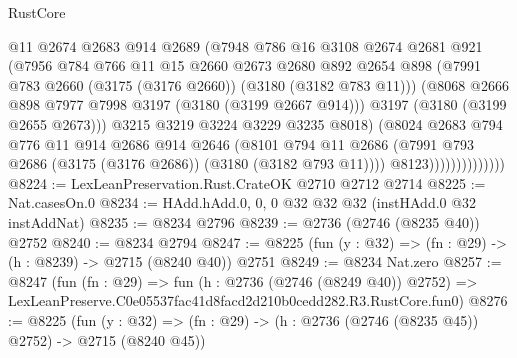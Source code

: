 \begin{lexlean}{RustCore}
\begin{coremodule}
                              @11
                              @2674
                              @2683
                              @914
                              @2689
                              (@7948
                                @786
                                @16
                                @3108
                                @2674
                                @2681
                                @921
                                (@7956
                                  @784
                                  @766
                                  @11
                                  @15
                                  @2660
                                  @2673
                                  @2680
                                  @892
                                  @2654
                                  @898
                                  (@7991 @783 @2660 (@3175 (@3176 @2660)) (@3180 (@3182 @783 @11)))
                                  (@8068 @2666 @898 @7977 @7998 @3197 (@3180 (@3199 @2667 @914)))
                                  @3197
                                  (@3180 (@3199 @2655 @2673)))
                                @3215
                                @3219
                                @3224
                                @3229
                                @3235
                                @8018)
                              (@8024
                                @2683
                                @794
                                @776
                                @11
                                @914
                                @2686
                                @914
                                @2646
                                (@8101
                                  @794
                                  @11
                                  @2686
                                  (@7991 @793 @2686 (@3175 (@3176 @2686)) (@3180 (@3182 @793 @11))))
                                @8123))))))))))))))
@8224 := LexLeanPreservation.Rust.CrateOK @2710 @2712 @2714
@8225 := Nat.casesOn.{0}
@8234 := HAdd.hAdd.{0, 0, 0} @32 @32 @32 (instHAdd.{0} @32 instAddNat)
@8235 := @8234 @2796
@8239 := @2736 (@2746 (@8235 @40)) @2752
@8240 := @8234 @2794
@8247 := @8225 (fun (y : @32) => (fn : @29) -> (h : @8239) -> @2715 (@8240 @40)) @2751
@8249 := @8234 Nat.zero
@8257 := @8247
    (fun (fn : @29) =>
    fun (h : @2736 (@2746 (@8249 @40)) @2752) =>
    LexLeanPreserve.C0e05537fac41d8facd2d210b0cedd282.R3.RustCore.fun0)
@8276 := @8225
    (fun (y : @32) => (fn : @29) -> (h : @2736 (@2746 (@8235 @45)) @2752) -> @2715 (@8240 @45))

\end{coremodule}
\end{lexlean}
